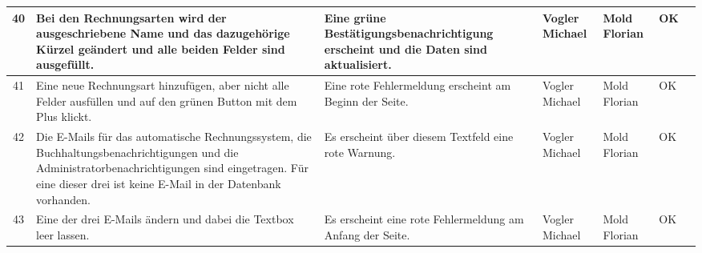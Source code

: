 \begin{longtable}[h]{| c | p{3.7cm} | p{3.8cm} | l | l | l | c |}
40 & Bei den Rechnungsarten wird der ausgeschriebene Name und das dazugehörige Kürzel geändert und alle beiden Felder sind ausgefüllt. & Eine grüne Bestätigungsbenachrichtigung erscheint und die Daten sind aktualisiert. & Vogler Michael & Mold Florian & OK \\ \hline

41 & Eine neue Rechnungsart hinzufügen, aber nicht alle Felder ausfüllen und auf den grünen Button mit dem Plus klickt. & Eine rote Fehlermeldung erscheint am Beginn der Seite. & Vogler Michael & Mold Florian & OK \\ \hline

42 & Die E-Mails für das automatische Rechnungssystem, die Buchhaltungsbenachrichtigungen und die Administratorbenachrichtigungen sind eingetragen. Für eine dieser drei ist keine E-Mail in der Datenbank vorhanden. & Es erscheint über diesem Textfeld eine rote Warnung. & Vogler Michael & Mold Florian & OK \\ \hline

43 & Eine der drei E-Mails ändern und dabei die Textbox leer lassen. & Es erscheint eine rote Fehlermeldung am Anfang der Seite. & Vogler Michael & Mold Florian & OK \\ \hline
\end{longtable}

\clearpage